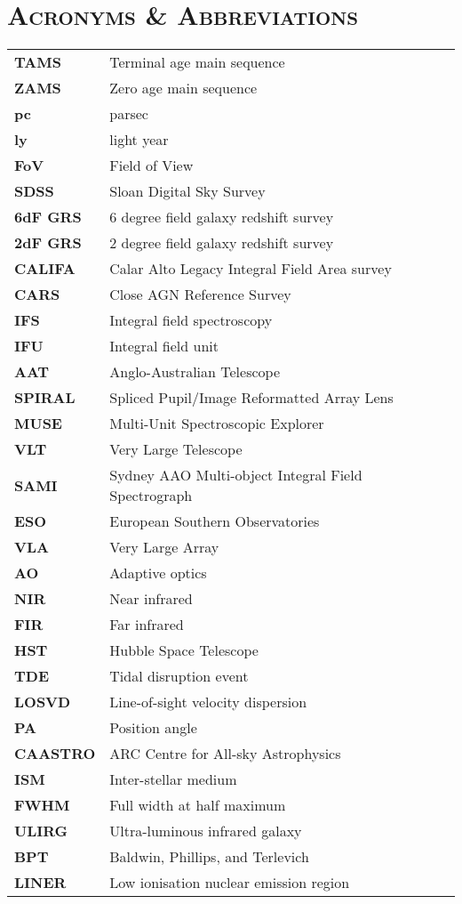 \chapter*{\textsc{Acronyms \& Abbreviations}}

\vspace{-1cm}
\setlength{\tabcolsep}{25pt}

{%
\begin{tabular}{ll}
{\bf TAMS} & Terminal age main sequence \\
{\bf ZAMS}  & Zero age main sequence \\
{\bf pc}  & parsec \\
{\bf ly} & light year \\
{\bf FoV} & Field of View \\

{\bf SDSS} & Sloan Digital Sky Survey \\
{\bf 6dF GRS} & 6 degree field galaxy redshift survey \\
{\bf 2dF GRS}  & 2 degree field galaxy redshift survey \\
{\bf CALIFA}  & Calar Alto Legacy Integral Field Area survey \\
{\bf CARS}  & Close AGN Reference Survey \\
{\bf IFS}  & Integral field spectroscopy \\
{\bf IFU}  & Integral field unit \\
{\bf AAT}  & Anglo-Australian Telescope \\
{\bf SPIRAL}  & Spliced Pupil/Image Reformatted Array Lens \\
{\bf MUSE}  & Multi-Unit Spectroscopic Explorer \\
{\bf VLT}  & Very Large Telescope \\
{\bf SAMI}  & Sydney AAO Multi-object Integral Field Spectrograph\\
{\bf ESO}  & European Southern Observatories \\
{\bf VLA}  & Very Large Array  \\
{\bf AO}  & Adaptive optics \\
{\bf NIR}  & Near infrared \\
{\bf FIR}  & Far infrared \\
{\bf HST}  & Hubble Space Telescope \\
{\bf TDE}  & Tidal disruption event \\
{\bf LOSVD}  & Line-of-sight velocity dispersion \\
{\bf PA}  & Position angle \\
{\bf CAASTRO}  & ARC Centre for All-sky Astrophysics \\
{\bf ISM}  & Inter-stellar medium \\
{\bf FWHM}  & Full width at half maximum \\
{\bf ULIRG}  & Ultra-luminous infrared galaxy \\
{\bf BPT}  & Baldwin, Phillips, and Terlevich \\
{\bf LINER}  & Low ionisation nuclear emission region \\



\end{tabular}
}